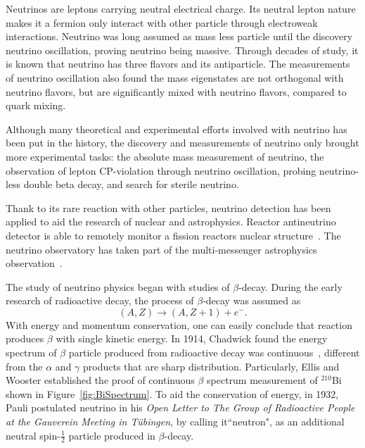 \label{Ch1}

    Neutrinos are leptons carrying neutral electrical charge.
    Its neutral lepton nature makes it a fermion only interact with other particle through electroweak interactions.
    Neutrino was long assumed as mass less particle until the discovery neutrino oscillation, proving neutrino being massive.
    Through decades of study, it is known that neutrino has three flavors and its antiparticle.
    The measurements of neutrino oscillation also found the mass eigenstates are not orthogonal with neutrino flavors, but are significantly mixed with neutrino flavors, compared to quark mixing.
    
    Although many theoretical and experimental efforts involved with neutrino has been put in the history, the discovery and measurements of neutrino only brought more experimental tasks: the absolute mass measurement of neutrino, the observation of lepton CP-violation through neutrino oscillation, probing neutrino-less double beta decay, and  search for sterile neutrino.
    
    Thank to its rare reaction with other particles, neutrino detection has been applied to aid the research of nuclear and astrophysics.
    Reactor antineutrino detector is able to remotely monitor a fission reactors nuclear structure~\cite{bib:DYBSpectrum, bib:DYBEvo}. 
    The neutrino observatory has taken part of the multi-messenger astrophysics observation~\cite{bib:IceCube}.

\label{Ch1Sec2}
    
    The study of neutrino physics began with studies of $\beta$-decay.
    During the early research of radioactive decay, the process of $\beta$-decay was assumed as
    \begin{equation}
    (A, Z) \rightarrow (A, Z+1) + e^-.
    \end{equation}
    With energy and momentum conservation, one can easily conclude that reaction produces $\beta$ with single kinetic energy.
    In 1914, Chadwick found the energy spectrum of $\beta$ particle produced from radioactive decay was continuous~\cite{bib:Chadwick}, different from the $\alpha$ and $\gamma$ products that are sharp distribution.
    Particularly, Ellis and Wooster established the proof of continuous $\beta$ spectrum measurement of $^{210}$Bi~\cite{bib:EandW} shown in Figure~\ref{fig:BiSpectrum}.
    To aid the conservation of energy, in 1932, Pauli postulated neutrino in his \textit{Open Letter to The Group of Radioactive People at the Gauverein Meeting in Tübingen}, by calling it``neutron", as an additional neutral spin-$\frac{1}{2}$ particle produced in $\beta$-decay.

